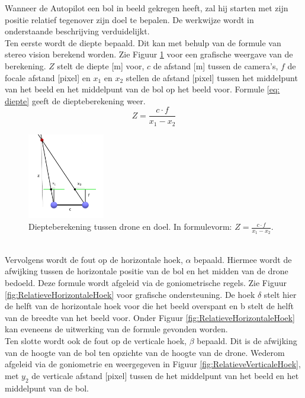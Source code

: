 \noindent
Wanneer de Autopilot een bol in beeld gekregen heeft, zal hij starten met zijn positie relatief tegenover zijn doel te bepalen. De werkwijze wordt in onderstaande beschrijving verduidelijkt.
\\
Ten eerste wordt de diepte bepaald. Dit kan met behulp van de formule van stereo vision \cite{website:techbriefs} berekend worden.
Zie Figuur \ref{fig:DiepteberekeningDroneEnDoel} voor een grafische weergave van de berekening. \(Z\) stelt de diepte [m] voor, \(c\) de afstand [m] tussen de camera's, \(f\) de focale afstand [pixel] en $x_1$ en $x_2$ stellen de afstand [pixel] tussen het middelpunt van het beeld en het middelpunt van de bol op het beeld voor. Formule \ref{eq: diepte} geeft de diepteberekening weer.
\begin{equation} \label{eq: diepte}
Z = \frac{c \cdot f}{x_1 - x_2}
\end{equation}
\begin{figure}[h]
	\centering
	\includegraphics[width=0.3\textwidth]{DiepteberekeningDroneEnDoel.png}
	\caption{Diepteberekening tussen drone en doel. In formulevorm: \(Z = \frac{c \cdot f}{x_1 - x_2}\).}
	\label{fig:DiepteberekeningDroneEnDoel}
\end{figure}
\\
Vervolgens wordt de fout op de horizontale hoek, $\alpha$ bepaald. Hiermee wordt de afwijking tussen de horizontale positie van de bol en het midden van de drone bedoeld. Deze formule wordt afgeleid via de goniometrische regels. Zie Figuur \ref{fig:RelatieveHorizontaleHoek} voor grafische ondersteuning. De hoek $\delta$ stelt hier de helft van de horizontale hoek voor die het beeld overspant en b stelt de helft van de breedte van het beeld voor. Onder Figuur \ref{fig:RelatieveHorizontaleHoek} kan eveneens de uitwerking van de formule gevonden worden.
\\
Ten slotte wordt ook de fout op de verticale hoek, $\beta$ bepaald. Dit is de afwijking van de hoogte van de bol ten opzichte van de hoogte van de drone. Wederom afgeleid via de goniometrie en weergegeven in Figuur \ref{fig:RelatieveVerticaleHoek}, met $y_2$ de verticale afstand [pixel] tussen de het middelpunt van het beeld en het middelpunt van de bol.
